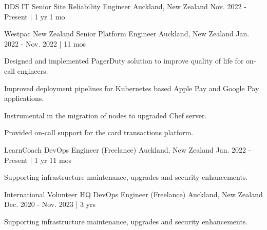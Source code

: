 


\begin{cventries}


\cventry
{DDS IT} %
{Senior Site Reliability Engineer} %
{Auckland, New Zealand} %
{Nov. 2022 - Present | 1 yr 1 mo} %
{ %
}

\cventry
{Westpac New Zealand} %
{Senior Platform Engineer} %
{Auckland, New Zealand} %
{Jan. 2022 - Nov. 2022 | 11 mos} %
{ %
\begin{cvitems}
\item {Designed and implemented PagerDuty solution to improve quality of life for on-call engineers.}
\item {Improved deployment pipelines for Kubernetes based Apple Pay and Google Pay applications.}
\item {Instrumental in the migration of nodes to upgraded Chef server.}
\item {Provided on-call support for the card transactions platform.}
\end{cvitems}
}


\cventry
{LearnCoach} %
{DevOps Engineer (Freelance)} %
{Auckland, New Zealand} %
{Jan. 2022 - Present | 1 yr 11 mos} %
{ %
\begin{cvitems}
\item {Supporting infrastructure maintenance, upgrades and security enhancements.}
\end{cvitems}
}


\cventry
{International Volunteer HQ} %
{DevOps Engineer (Freelance)} %
{Auckland, New Zealand} %
{Dec. 2020 - Nov. 2023 | 3 yrs} %
{ %
\begin{cvitems}
\item {Supporting infrastructure maintenance, upgrades and security enhancements.}
\end{cvitems}
}


\end{cventries}
